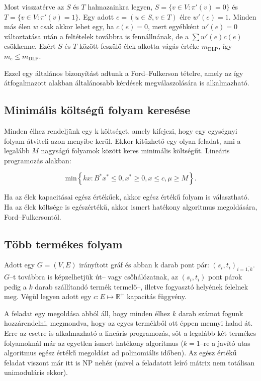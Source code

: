 Most visszatérve az $S$ és $T$ halmazainkra legyen, $S=\{v \in V: \pi'(v)=0\} $
és $T=\{v \in V: \pi'(v)=1\}$. Egy adott $e=(u \in S, v \in T)$ élre $w'(e)=1$.
Minden más élen $w$ csak akkor lehet egy, ha $c(e)=0$, mert egyébként $w'(e)=0$
változtatása után a feltételek továbbra is fennállnának, de a $\sum w'(e)c(e)$
csökkenne. Ezért $S$ és $T$ között feszülő élek alkotta vágás értéke
$m_{\mbox{DLP}}$, így $m_{\mbox{c}} \leq m_{\mbox{DLP}}$.

Ezzel egy általános bizonyítást adtunk a Ford--Fulkerson tételre, amely az így
átfogalmazott alakban általánosabb kérdések megválaszolására is alkalmazható.

\subsection{Minimális költségű folyam keresése}

Minden élhez rendeljünk egy k költséget, amely kifejezi, hogy egy egységnyi folyam
átviteli azon menyibe kerül. Ekkor kitűzhető egy olyan feladat, ami a legalább $M$
nagyságú folyamok között keres minimális költségűt. Lineáris programozás alakban:

\[ \mbox{min} \left\{kx: B^*x^* \leq 0, x^* \geq 0, x \leq c,\mu \geq M \right\}. \]

Ha az élek kapacitásai egész értékűek, akkor egész értékű folyam is választható.
Ha az élek költsége is egészértékű, akkor ismert hatékony algoritmus megoldására,
Ford--Fulkersontól.

\subsection{Több termékes folyam}

Adott egy $G=(V,E)$ irányított gráf és abban k darab pont pár:
$(s_i,t_i)_{i = \overline{1,k}}$. $G$--t továbbra is képzelhetjük út-- vagy
csőhálózatnak, az $(s_i, t_i)$ pont párok pedig a $k$ darab szállítandó termék
termelő--, illetve fogyasztó helyének felelnek meg. Végül legyen adott egy $c:E
\mapsto \mathbb{R}^+$ kapacitás függvény.

A feladat egy megoldása abból áll, hogy minden élhez $k$ darab számot fogunk
hozzárendelni, megmondva, hogy az egyes termékből ott éppen mennyi halad át.
Erre az esetre is alkalmazható a lineáris programozás, sőt a legalább két
termékes folyamoknál már az egyetlen ismert hatékony algoritmus ($k=1$--re a
javító utas algoritmus egész értékű megoldást ad polinomiális időben). Az egész
értékű feladat viszont már itt is NP nehéz (mivel a feladatott leíró mátrix nem
totálisan unimoduláris ekkor).